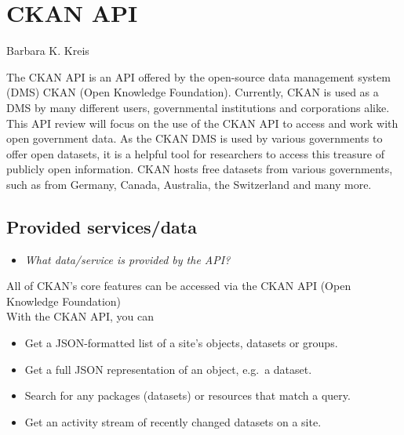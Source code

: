 \documentclass[
]{book}
\providecommand{\tightlist}{%
  \setlength{\itemsep}{0pt}\setlength{\parskip}{0pt}}
\begin{document}
\hypertarget{ckan-api}{%
\chapter{CKAN API}\label{ckan-api}}

Barbara K. Kreis

The CKAN API is an API offered by the open-source data management system (DMS) CKAN (Open Knowledge Foundation). Currently, CKAN is used as a DMS by many different users, governmental institutions and corporations alike.\\
This API review will focus on the use of the CKAN API to access and work with open government data. As the CKAN DMS is used by various governments to offer open datasets, it is a helpful tool for researchers to access this treasure of publicly open information. CKAN hosts free datasets from various governments, such as from Germany, Canada, Australia, the Switzerland and many more.

\hypertarget{provided-servicesdata-9}{%
\section{Provided services/data}\label{provided-servicesdata-9}}

\begin{itemize}
\tightlist
\item
  \emph{What data/service is provided by the API?}
\end{itemize}

All of CKAN's core features can be accessed via the CKAN API (Open Knowledge Foundation)\\
With the CKAN API, you can

\begin{itemize}
\tightlist
\item
  Get a JSON-formatted list of a site's objects, datasets or groups.
\item
  Get a full JSON representation of an object, e.g.~a dataset.
\item
  Search for any packages (datasets) or resources that match a query.
\item
  Get an activity stream of recently changed datasets on a site.
\end{itemize}
\end{document}
